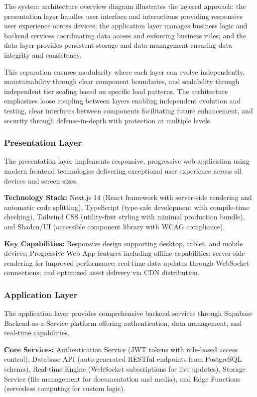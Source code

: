 The system architecture overview diagram illustrates the layered approach: the presentation layer handles user interface and interactions providing responsive user experience across devices; the application layer manages business logic and backend services coordinating data access and enforcing business rules; and the data layer provides persistent storage and data management ensuring data integrity and consistency.

This separation ensures modularity where each layer can evolve independently, maintainability through clear component boundaries, and scalability through independent tier scaling based on specific load patterns. The architecture emphasizes loose coupling between layers enabling independent evolution and testing, clear interfaces between components facilitating future enhancement, and security through defense-in-depth with protection at multiple levels.

\subsubsection{Presentation Layer}

The presentation layer implements responsive, progressive web application using modern frontend technologies delivering exceptional user experience across all devices and screen sizes.

\textbf{Technology Stack:} Next.js 14 (React framework with server-side rendering and automatic code splitting), TypeScript (type-safe development with compile-time checking), Tailwind CSS (utility-first styling with minimal production bundle), and Shadcn/UI (accessible component library with WCAG compliance).

\textbf{Key Capabilities:} Responsive design supporting desktop, tablet, and mobile devices; Progressive Web App features including offline capabilities; server-side rendering for improved performance; real-time data updates through WebSocket connections; and optimized asset delivery via CDN distribution.

\subsubsection{Application Layer}

The application layer provides comprehensive backend services through Supabase Backend-as-a-Service platform offering authentication, data management, and real-time capabilities.

\textbf{Core Services:} Authentication Service (JWT tokens with role-based access control), Database API (auto-generated RESTful endpoints from PostgreSQL schema), Real-time Engine (WebSocket subscriptions for live updates), Storage Service (file management for documentation and media), and Edge Functions (serverless computing for custom logic).

